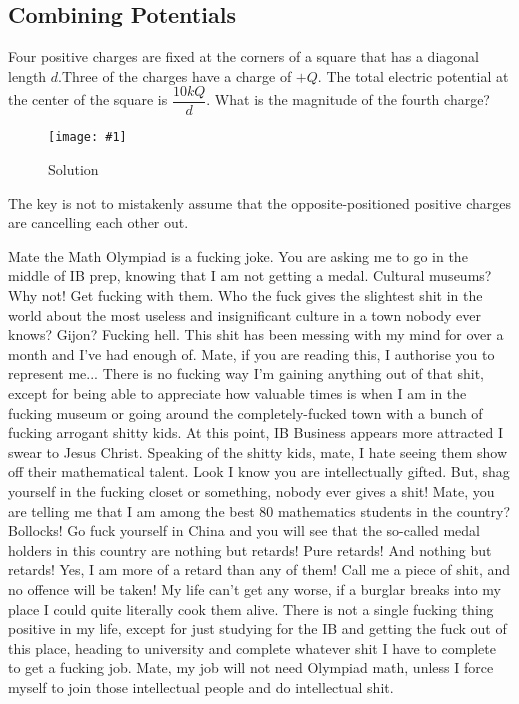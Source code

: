 \documentclass[a4paper,12pt]{article}
\newcommand{\img}[4]{\begin{center}
  \begin{figure}[H]
    \centering
    \texttt{[image: \#1]}
    \caption{#3}
    \label{fig:#4}
  \end{figure}
\end{center}}
\begin{document}
\pagebreak
\subsection{Combining Potentials}

Four positive charges are fixed at the corners of a square that has a diagonal length $d$.Three of the charges have a charge of $+Q$. The total electric potential at the center of the square is $\dfrac{10kQ}{d}$.
What is the magnitude of the fourth charge?

\img{ex/1.jpg}{0.9}{Solution}{1}

The key is not to mistakenly assume that the opposite-positioned positive charges are cancelling each other out.

\pagebreak

Mate the Math Olympiad is a fucking joke. You are asking me to go in the middle of IB prep, knowing that I am not getting a medal. Cultural museums? Why not! Get fucking with them. Who the fuck gives the slightest shit in the world about the most useless and insignificant culture in a town nobody ever knows? Gijon? Fucking hell. This shit has been messing with my mind for over a month and I've had enough of. Mate, if you are reading this, I authorise you to represent me... There is no fucking way I'm gaining anything out of that shit, except for being able to appreciate how valuable times is when I am in the fucking museum or going around the completely-fucked town with a bunch of fucking arrogant shitty kids. At this point, IB Business appears more attracted I swear to Jesus Christ. Speaking of the shitty kids, mate, I hate seeing them show off their mathematical talent. Look I know you are intellectually gifted. But, shag yourself in the fucking closet or something, nobody ever gives a shit! Mate, you are telling me that I am among the best 80 mathematics students in the country? Bollocks! Go fuck yourself in China and you will see that the so-called medal holders in this country are nothing but retards! Pure retards! And nothing but retards! Yes, I am more of a retard than any of them! Call me a piece of shit, and no offence will be taken! My life can't get any worse, if a burglar breaks into my place I could quite literally cook them alive. There is not a single fucking thing positive in my life, except for just studying for the IB and getting the fuck out of this place, heading to university and complete whatever shit I have to complete to get a fucking job. Mate, my job will not need Olympiad math, unless I force myself to join those intellectual people and do intellectual shit.
\pagebreak
\end{document}
